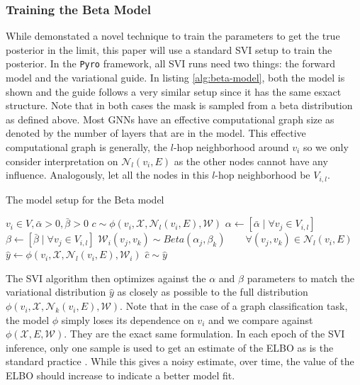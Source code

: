 \subsubsection{Training the Beta Model}
While \cite{bolla_estimating_2017} demonstated a novel technique to train the parameters to get the true posterior in the limit, this paper will use a standard SVI setup to train the posterior. In the \verb|Pyro| framework, all SVI runs need two things: the forward model and the variational guide. In listing \ref{alg:beta-model}, both the model is shown and the guide follows a very similar setup since it has the same esxact structure. Note that in both cases the mask is sampled from a beta distribution as defined above. Most GNNs have an effective computational graph size as denoted by the number of layers that are in the model. This effective computational graph is generally, the $l$-hop neighborhood around $v_i$ so we only consider interpretation on $\mathcal{N}_l(v_i, E)$ as the other nodes cannot have any influence. Analogously, let all the nodes in this $l$-hop neighborhood be $V_{i,l}$.
\begin{algorithm}[h]
	\centering
	\caption{The model setup for the Beta model}
	\label{alg:beta-model}
	\begin{algorithmic}
		\Require $v_i \in V, \bar{\alpha} > 0, \bar{\beta} > 0$
		\Require $c \sim \phi(v_i, \mathcal{X}, \mathcal{N}_l(v_i, E), \mathcal{W})$
		\State $\alpha \gets [\bar{\alpha} \mid \forall v_j \in V_{i,l}]$
		\State $\beta \gets [\bar{\beta} \mid \forall v_j \in V_{i, l}]$
		\State $\mathcal{W}_i(v_j, v_k) \sim Beta(\alpha_j, \beta_k) \quad\quad \forall (v_j, v_k) \in \mathcal{N}_l(v_i, E)$
		\State $\hat{y} \gets \phi(v_i, \mathcal{X}, \mathcal{N}_l(v_i, E), \mathcal{W}_i)$
		\State $\hat{c} \sim \hat{y}$
	\end{algorithmic}
\end{algorithm}

The SVI algorithm then optimizes against the $\alpha$ and $\beta$ parameters to match the variational distribution $\hat{y}$ as closely as possible to the full distribution $\phi(v_i, \mathcal{X}, \mathcal{N}_k(v_i, E), \mathcal{W})$. Note that in the case of a graph classification task, the model $\phi$ simply loses its dependence on $v_i$ and we compare against $\phi(\mathcal{X}, E, \mathcal{W})$. They are the exact same formulation. In each epoch of the SVI inference, only one sample is used to get an estimate of the ELBO as is the standard practice \cite{jospin_hands-bayesian_2022}. While this gives a noisy estimate, over time, the value of the ELBO should increase to indicate a better model fit.

